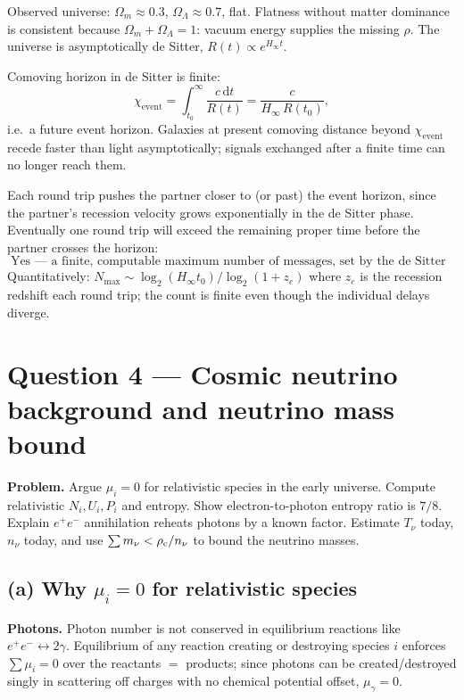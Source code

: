 \documentclass[11pt]{article}
\newcommand{\de}{\mathrm{d}}
\begin{document}
Observed universe: $\Omega_m\approx 0.3$, $\Omega_\Lambda\approx 0.7$, flat. Flatness without matter dominance is consistent because $\Omega_m+\Omega_\Lambda=1$: vacuum energy supplies the missing $\rho$. The universe is asymptotically de Sitter, $R(t)\propto e^{H_\infty t}$.

Comoving horizon in de Sitter is finite:
\[
\chi_{\text{event}} = \int_{t_0}^{\infty}\frac{c\,\de t}{R(t)} = \frac{c}{H_\infty\,R(t_0)},
\]
i.e.\ a future event horizon. Galaxies at present comoving distance beyond $\chi_{\text{event}}$ recede faster than light asymptotically; signals exchanged after a finite time can no longer reach them.

Each round trip pushes the partner closer to (or past) the event horizon, since the partner's recession velocity grows exponentially in the de Sitter phase. Eventually one round trip will exceed the remaining proper time before the partner crosses the horizon:
\[
\boxed{\;\text{Yes --- a finite, computable maximum number of messages, set by the de Sitter event horizon.}\;}
\]
Quantitatively: $N_{\max}\sim\log_2(H_\infty t_0)/\log_2(1+z_e)$ where $z_e$ is the recession redshift each round trip; the count is finite even though the individual delays diverge.

\section*{Question 4 --- Cosmic neutrino background and neutrino mass bound}

\textbf{Problem.} Argue $\mu_i=0$ for relativistic species in the early universe. Compute relativistic $N_i,U_i,P_i$ and entropy. Show electron-to-photon entropy ratio is $7/8$. Explain $e^+ e^-$ annihilation reheats photons by a known factor. Estimate $T_\nu$ today, $n_\nu$ today, and use $\sum m_\nu < \rho_{\rm c}/n_\nu$ to bound the neutrino masses.

\subsection*{(a) Why $\mu_i=0$ for relativistic species}

\textbf{Photons.} Photon number is not conserved in equilibrium reactions like $e^+ e^- \leftrightarrow 2\gamma$. Equilibrium of any reaction creating or destroying species $i$ enforces $\sum\mu_i = 0$ over the reactants $=$ products; since photons can be created/destroyed singly in scattering off charges with no chemical potential offset, $\mu_\gamma = 0$.
\end{document}

